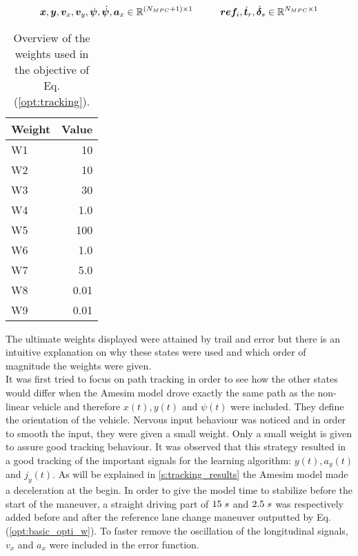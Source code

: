 \[\bm{x},\bm{y},\bm{v}_x,\bm{v}_y,\bm{\psi},\dot{\bm{\psi}},\bm{a}_x \in \mathbb{R}^{(N_{MPC}+1)\times1} \hspace{10mm}\bm{ref}_{i},\dot{\bm{t}}_r,\dot{\bm{\delta}}_s \in \mathbb{R}^{N_{MPC}\times1}\]


\begin{table}[h!]
	\centering
	\begin{tabular}{@{}lr@{}} 
		Weight    & Value\\ \midrule
		W1      & 10\\
		W2          & 10\\
		W3 	   & 30\\
		W4       & 1.0\\
		W5       & 100\\
		W6       & 1.0\\
		W7       & 5.0\\
		W8       & 0.01\\
		W9  & 0.01\\ \bottomrule
	\end{tabular}
	\caption{Overview of the weights used in the objective of Eq. (\ref{opt:tracking}).}
	\label{tab:weights}
\end{table}

The ultimate weights displayed were attained by trail and error but there is an intuitive explanation on why these states were used and which order of magnitude the weights were given.\\
It was first tried to focus on path tracking in order to see how the other states would differ when the Amesim model drove exactly the same path as the non-linear vehicle and therefore $x(t),y(t)$ and $\psi(t)$ were included. They define the orientation of the vehicle. Nervous input behaviour was noticed and in order to smooth the input, they were given a small weight. Only a small weight is given to assure  good tracking behaviour. It was observed that this strategy resulted in a good tracking of the important signals for the learning algorithm: $y(t), a_y(t)$ and $j_y(t)$. As will be explained in \ref{s:tracking_results} the Amesim model made a deceleration at the begin. In order to  give the model time to stabilize before the start of the maneuver, a straight driving part of $15\hspace{1mm}s$ and $2.5\hspace{1mm}s$ was respectively added before and after the reference lane change maneuver outputted by Eq. (\ref{opt:basic_opti_w}). To faster remove the oscillation of the longitudinal signals, $v_x$ and $a_x$ were included in the error function.\\

